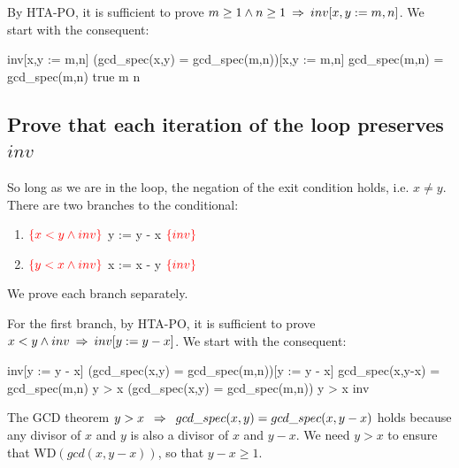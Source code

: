 \documentclass[runningheads,12pt]{article}
\def\WD{\textrm{WD}}
\def\assert#1{\textcolor{red}{ {\{} {#1} {\}}}}
\begin{document}
\noindent By HTA-PO, it is sufficient to prove $m \geq 1 \land n \geq 1 \; \mathbin\Rightarrow \; inv[x,y := m,n]$. We start with the consequent:
\vspace{-4pt}
\begin{calculation}
	inv[x,y := m,n]
	(gcd\_spec(x,y) = gcd\_spec(m,n))[x,y := m,n]
	gcd\_spec(m,n) = gcd\_spec(m,n)
	true 
	m  \land n  \qquad\blacksquare
\end{calculation}

	
\subsection{Prove that each iteration of the loop preserves $inv$}

So long as we are in the loop, the negation of the exit condition holds, i.e. $x \neq y$. There are two branches to the conditional:

\begin{enumerate}
  \item $\assert{ x < y \land inv}$ y := y - x $\assert{ inv}$
  \item $\assert{ y < x \land inv}$ x := x - y $\assert{ inv}$
\end{enumerate}

\noindent We prove each branch separately. 

For the first branch, by HTA-PO, it is sufficient to prove $x < y \land inv \; \mathbin\Rightarrow \; inv[y := y - x]$. We start with the consequent:
		
\begin{calculation}
	inv[y := y - x]
	(gcd\_spec(x,y) \1= gcd\_spec(m,n))[y := y - x]
	gcd\_spec(x,y-x) \1= gcd\_spec(m,n)
	y > x \limp (gcd\_spec(x,y) \1= gcd\_spec(m,n))
	y > x \1\limp inv \qquad\blacksquare
\end{calculation}

The GCD theorem $y > x \; \; \mathbin\Rightarrow \; \; gcd\_spec(x,y) = gcd\_spec(x,y-x)$ holds because any divisor of $x$ and $y$ is also a divisor of $x$ and $y-x$. We need $y > x$ to ensure that $\WD(gcd(x,y-x))$, so that $y-x \geq 1$.
\end{document}
